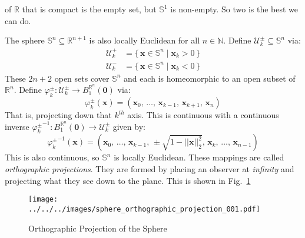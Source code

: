 \documentclass{article}
\theoremstyle{plain}
\theoremstyle{normal}
\newenvironment{example}{%
    \pushQED{\qed}\renewcommand{\qedsymbol}{$\blacksquare$}\examplex%
}{%
    \popQED\endexamplex%
}
\begin{document}
        of $\mathbb{R}$ that is compact is the empty set, but
        $\mathbb{S}^{1}$ is non-empty. So two is the best we can do.
        \begin{example}
            The sphere $\mathbb{S}^{n}\subseteq\mathbb{R}^{n+1}$ is also
            locally Euclidean for all $n\in\mathbb{N}$. Define
            $\mathcal{U}_{k}^{\pm}\subseteq\mathbb{S}^{n}$ via:
            \begin{align}
                \mathcal{U}_{k}^{+}
                &=\{\,\mathbf{x}\in\mathbb{S}^{n}\;|\;
                    \mathbf{x}_{k}>0\,\}\\
                \mathcal{U}_{k}^{-}
                &=\{\,\mathbf{x}\in\mathbb{S}^{n}\;|\;
                    \mathbf{x}_{k}<0\,\}
            \end{align}
            These $2n+2$ open sets cover $\mathbb{S}^{n}$ and each is
            homeomorphic to an open subset of $\mathbb{R}^{n}$. Define
            $\varphi_{k}^{\pm}:\mathcal{U}_{k}^{\pm}\rightarrow{B}_{1}^{\mathbb{R}^{n}}(\mathbf{0})$
            via:
            \begin{equation}
                \varphi_{k}^{\pm}(\mathbf{x})=
                (\mathbf{x}_{0},\,\dots,\,\mathbf{x}_{k-1},\,
                    \mathbf{x}_{k+1},\,\mathbf{x}_{n})
            \end{equation}
            That is, projecting down that $k^{th}$ axis. This is continuous
            with a continuous inverse
            ${\varphi_{k}^{\pm}}^{-1}:B_{1}^{\mathbb{R}^{n}}(\mathbf{0})\rightarrow\mathcal{U}_{k}^{\pm}$
            given by:
            \begin{equation}
                {\varphi_{k}^{\pm}}^{-1}(\mathbf{x})
                =(\mathbf{x}_{0},\,\dots,\,\mathbf{x}_{k-1},\,
                    \pm\sqrt{1-||\mathbf{x}||_{2}^{2}},\,\mathbf{x}_{k},\,
                    \dots,\,\mathbf{x}_{n-1})
            \end{equation}
            This is also continuous, so $\mathbb{S}^{n}$ is locally Euclidean.
        \end{example}
        These mappings are called \textit{orthographic projections}. They are
        formed by placing an observer at \textit{infinity} and projecting what
        they see down to the plane. This is shown in
        Fig.~\ref{fig:orthographic_projection_001}
        \begin{figure}
            \centering
            \texttt{[image: ../../../images/sphere\_orthographic\_projection\_001.pdf]}
            \caption{Orthographic Projection of the Sphere}
            \label{fig:orthographic_projection_001}
        \end{figure}
\end{document}
